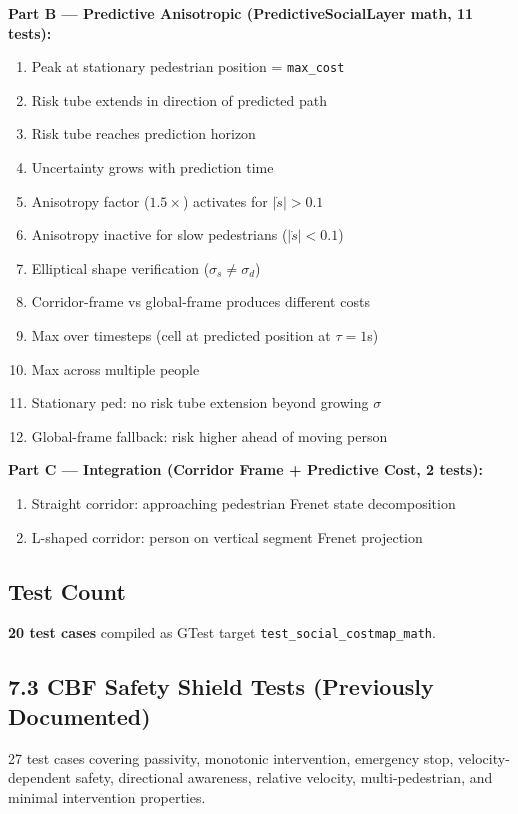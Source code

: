 \documentclass[11pt]{article}
\newcommand{\logentry}[1]{\subsection*{#1}}
\begin{document}
\textbf{Part B --- Predictive Anisotropic (PredictiveSocialLayer math, 11 tests):}
\begin{enumerate}
  \item Peak at stationary pedestrian position = \texttt{max\_cost}
  \item Risk tube extends in direction of predicted path
  \item Risk tube reaches prediction horizon
  \item Uncertainty grows with prediction time
  \item Anisotropy factor ($1.5\times$) activates for $|\dot{s}| > 0.1$
  \item Anisotropy inactive for slow pedestrians ($|\dot{s}| < 0.1$)
  \item Elliptical shape verification ($\sigma_s \neq \sigma_d$)
  \item Corridor-frame vs global-frame produces different costs
  \item Max over timesteps (cell at predicted position at $\tau = 1$s)
  \item Max across multiple people
  \item Stationary ped: no risk tube extension beyond growing $\sigma$
  \item Global-frame fallback: risk higher ahead of moving person
\end{enumerate}

\textbf{Part C --- Integration (Corridor Frame + Predictive Cost, 2 tests):}
\begin{enumerate}
  \item Straight corridor: approaching pedestrian Frenet state decomposition
  \item L-shaped corridor: person on vertical segment Frenet projection
\end{enumerate}

\logentry{Test Count}
\textbf{20 test cases} compiled as GTest target \texttt{test\_social\_costmap\_math}.


\subsection*{7.3 CBF Safety Shield Tests (Previously Documented)}

27 test cases covering passivity, monotonic intervention, emergency stop,
velocity-dependent safety, directional awareness, relative velocity,
multi-pedestrian, and minimal intervention properties.
\end{document}
